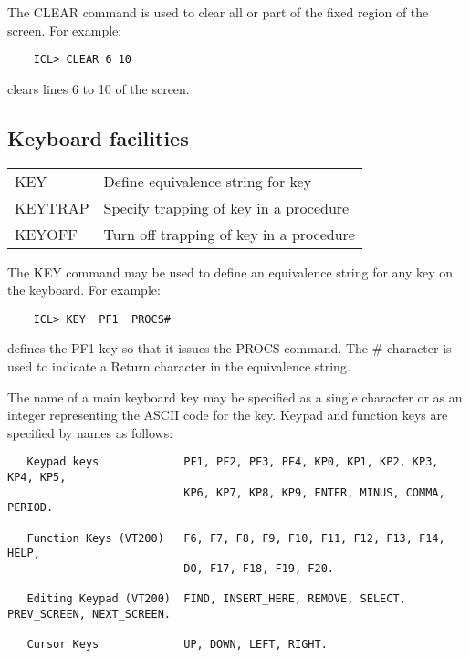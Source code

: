 The CLEAR command is used to clear all or part of the fixed region of the
screen.
For example:

\begin{small}
\begin{verbatim}
    ICL> CLEAR 6 10
\end{verbatim}
\end{small}

clears lines 6 to 10 of the screen.

\subsection{Keyboard facilities}

\begin{center}
\begin{tabular}{|l|l|}
\hline
KEY            & Define equivalence string for key \\
KEYTRAP        & Specify trapping of key in a procedure \\
KEYOFF         & Turn off trapping of key in a procedure \\
\hline
\end{tabular}
\end{center}

The KEY command may be used to define an equivalence string for any key
on the keyboard.
For example:

\begin{small}
\begin{verbatim}
    ICL> KEY  PF1  PROCS#
\end{verbatim}
\end{small}

defines the PF1 key so that it issues the PROCS command.
The \# character is used to indicate a Return character in the equivalence
string.

The name of a main keyboard key may be specified as a single character or
as an integer representing the ASCII code for the key.
Keypad and function keys are specified by names as follows:

\begin{small}
\begin{verbatim}
   Keypad keys             PF1, PF2, PF3, PF4, KP0, KP1, KP2, KP3, KP4, KP5,
                           KP6, KP7, KP8, KP9, ENTER, MINUS, COMMA, PERIOD.

   Function Keys (VT200)   F6, F7, F8, F9, F10, F11, F12, F13, F14, HELP,
                           DO, F17, F18, F19, F20.

   Editing Keypad (VT200)  FIND, INSERT_HERE, REMOVE, SELECT, PREV_SCREEN, NEXT_SCREEN.

   Cursor Keys             UP, DOWN, LEFT, RIGHT.
\end{verbatim}
\end{small}

